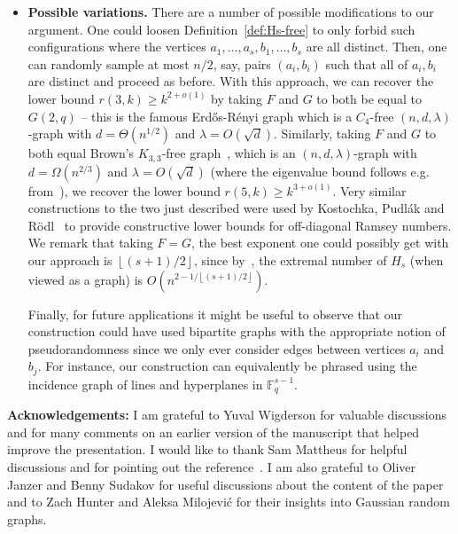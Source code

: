\documentclass{article}
\theoremstyle{plain}
\theoremstyle{definition}
\newcommand{\bF}{\mathbb{F}}
\newcommand{\floor}[1]{
    \left \lfloor #1 \right \rfloor
}
\begin{document}
\begin{itemize}
    \item \textbf{Possible variations.} There are a number of possible modifications to our argument. One could loosen Definition~\ref{def:Hs-free} to only forbid such configurations where the vertices $a_1, \dots, a_s, b_1, \dots, b_s$ are all distinct. Then, one can randomly sample at most $n/2$, say, pairs $(a_i, b_i)$ such that all of $a_i, b_i$ are distinct and proceed as before. With this approach, we can recover the lower bound $r(3, k) \ge k^{2 + o(1)}$ by taking $F$ and $G$ to both be equal to $G(2, q)$ -- this is the famous Erd\H{o}s-R\'{e}nyi graph which is a $C_4$-free $(n,d,\lambda)$-graph with $d = \Theta(n^{1/2})$ and $\lambda = O(\sqrt{d})$. Similarly, taking $F$ and $G$ to both equal Brown's $K_{3,3}$-free graph~\cite{brown}, which is an $(n,d,\lambda)$-graph with $d = \Omega(n^{2/3})$ and $\lambda = O(\sqrt{d})$ (where the eigenvalue bound follows e.g. from~\cite{medrano}), we recover the lower bound $r(5, k) \ge k^{3 + o(1)}$. Very similar constructions to the two just described were used by Kostochka, Pudl\'{a}k and R\"{o}dl~\cite{kostochka} to provide constructive lower bounds for off-diagonal Ramsey numbers. We remark that taking $F=G$, the best exponent one could possibly get with our approach is $\floor{(s+1)/2}$, since by~{\cite[Theorem~1.6]{grzesik}}, the extremal number of $H_s$ (when viewed as a graph) is $O(n^{2 - 1 / \floor{(s+1)/2}})$.
    
    Finally, for future applications it might be useful to observe that our construction could have used bipartite graphs with the appropriate notion of pseudorandomness since we only ever consider edges between vertices $a_i$ and $b_j$. For instance, our construction can equivalently be phrased using the incidence graph of lines and hyperplanes in $\bF_q^{s-1}$.
\end{itemize}

\textbf{Acknowledgements:} I am grateful to Yuval Wigderson for valuable discussions and for many comments on an earlier version of the manuscript that helped improve the presentation. I would like to thank Sam Mattheus for helpful discussions and for pointing out the reference~\cite{kostochka}. I am also grateful to Oliver Janzer and Benny Sudakov for useful discussions about the content of the paper and to Zach Hunter and Aleksa Milojevi\'{c} for their insights into Gaussian random graphs.




\appendix

\end{document}
